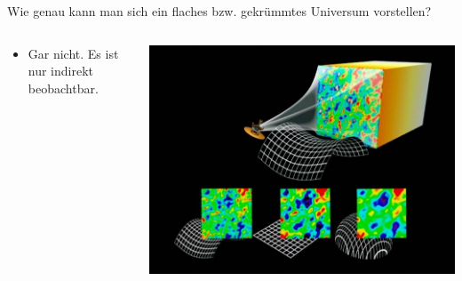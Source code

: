\begin{frame}{Wie genau kann man sich ein flaches bzw. gekrümmtes Universum vorstellen?}
  \begin{columns}[T, onlytextwidth]
    \begin{column}{0.47\textwidth}
      \begin{itemize}
      \setlength\itemsep{2em}
      \item Gar nicht. Es ist nur indirekt beobachtbar.
      \end{itemize}
      \end{column}
      \hfill
      \begin{column}{0.47\textwidth}
  \includegraphics[width=\textwidth]{images/Frage5.PNG}
\end{column}
\end{columns}
\end{frame}

